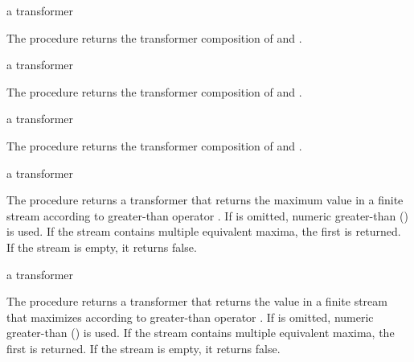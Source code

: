 \begin{procedure}
\end{procedure}
\returns{} a transformer

The  procedure returns the transformer composition of  and .

\begin{procedure}
\end{procedure}
\returns{} a transformer

The  procedure returns the transformer composition of  and .

\begin{procedure}
\end{procedure}
\returns{} a transformer

The  procedure returns the transformer composition of  and .

\begin{procedure}
\end{procedure}
\returns{} a transformer

The  procedure returns a transformer that returns the maximum value in a
finite stream according to greater-than operator . If  is omitted, numeric
greater-than (\code{>}) is used. If the stream contains multiple equivalent maxima, the
first is returned. If the stream is empty, it returns false.

\begin{procedure}
\end{procedure}
\returns{} a transformer

The  procedure returns a transformer that returns the value  in a
finite stream that maximizes  according to greater-than
operator . If  is omitted, numeric greater-than (\code{>}) is used. If the
stream contains multiple equivalent maxima, the first is returned. If the stream is empty,
it returns false.

